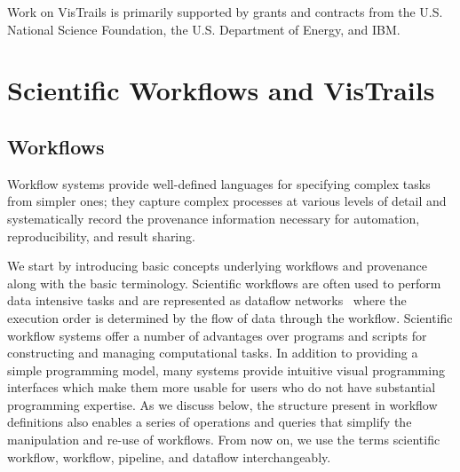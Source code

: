 \documentclass[12pt]{iopart}
\begin{document}
Work on VisTrails is primarily supported by grants and contracts from
the U.S. National Science Foundation, the U.S. Department of Energy,
and IBM.

\appendix

\section{Scientific Workflows and VisTrails}


\subsection{Workflows}

Workflow systems provide well-defined languages for specifying complex
tasks from simpler ones; they capture complex processes at various
levels of detail and systematically record the provenance information
necessary for automation, reproducibility, and result sharing.

We start by introducing basic concepts underlying
workflows and provenance along with the basic terminology.
Scientific workflows are often used to perform data intensive tasks
and are represented as dataflow networks~\cite{lee@ieee1995} where the
execution order is determined by the flow of data through the
workflow. Scientific workflow systems offer a number of advantages
over programs and scripts for constructing and
managing computational tasks. In addition to providing a simple
programming model, many systems provide intuitive visual programming
interfaces which make them more usable for users who do not have
substantial programming expertise. As we discuss below, the structure
present in workflow definitions also enables a series of operations
and queries that simplify the manipulation and re-use of workflows.
From now on, we use the terms scientific workflow, workflow, pipeline,
and dataflow interchangeably.
\end{document}
